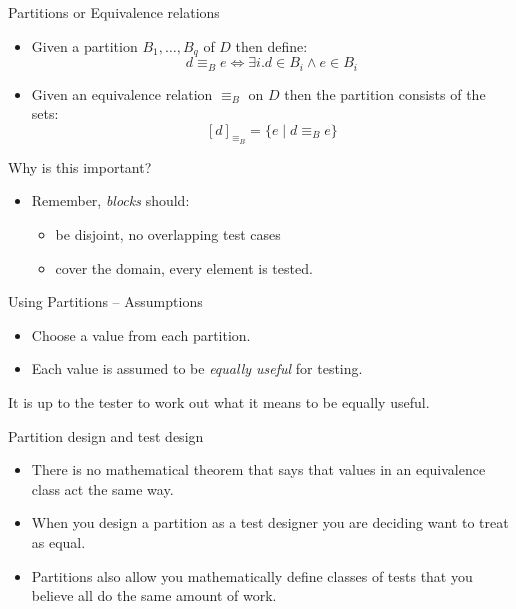 \documentclass{beamer}
\newcommand{\pauseslide}{}
\begin{document}
\begin{frame}{Partitions or Equivalence relations} 
  \begin{itemize}
  \item Given a partition $B_1,\ldots ,  B_q$ of $D$ then define:
    \[
      d \equiv_B e \Leftrightarrow \exists i. d \in B_i \land e \in B_i
    \]
  \item Given an equivalence relation $\equiv_B$ on $D$ then the
    partition consists of the sets:
    \[
    [d]_{\equiv_B} = \{ e \mid d \equiv_B e \}
    \]  
  \end{itemize}
  
\end{frame}
\begin{frame}{Why is this important?}
  \begin{itemize}
  \item Remember, {\it blocks} should: 
    \begin{itemize}
    \item be disjoint, no overlapping test cases
    \item cover the domain, every element is tested.
    \end{itemize}
  \end{itemize}  
\end{frame}
\begin{frame}{Using Partitions -- Assumptions}
  \begin{itemize}
  \item Choose a value from each partition.
  \item Each value is assumed to be {\em equally useful} for testing.
  \end{itemize}
It is up to the tester to work out what it means to be equally useful.
\end{frame}

\pauseslide

\begin{frame}{Partition design and test design}
  \begin{itemize}
  \item There is no mathematical theorem that says that values in an
    equivalence class act the same way.
  \item When you design a partition as a test designer you are
    deciding want to treat as equal.
  \item Partitions also allow you mathematically define classes of
    tests that you believe all do the same amount of work.
  \end{itemize}
\end{frame}
\end{document}
